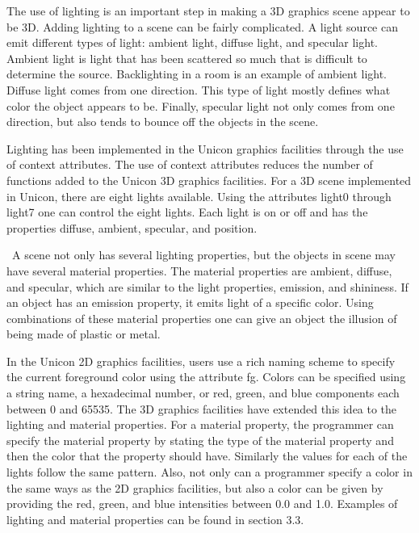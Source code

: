 \documentclass[letterpaper]{article}
\begin{document}
The use of lighting is an important step in making a 3D graphics scene
appear to be 3D. Adding lighting to a scene can be fairly
complicated. A light source can emit different types of light: ambient
light, diffuse light, and specular light. Ambient light is light
that has been scattered so much that is difficult to determine the
source. Backlighting in a room is an example of ambient light. Diffuse
light comes from one direction. This type of light mostly defines what
color the object appears to be. Finally, specular light not only comes
from one direction, but also tends to bounce off the objects in the
scene.

{
Lighting has been implemented in the Unicon graphics facilities through the use of context attributes. The use of
context attributes reduces the number of functions added to the Unicon 3D graphics facilities. For a 3D scene
implemented in Unicon, there are eight lights available. Using the attributes \textsf{light0} through \textsf{light7}
one can control the eight lights. Each light is \textsf{on} or \textsf{off} and has the properties \textsf{diffuse},
\textsf{ambient}, \textsf{specular}, and \textsf{position}. }

{
\ A scene not only has several lighting properties, but the objects in scene may have several material properties. The
material properties are ambient, diffuse, and specular, which are similar to the light properties, emission, and
shininess. If an object has an emission property, it emits light of a specific color. Using combinations of these
material properties one can give an object the illusion of being made of plastic or metal. }

{
In the Unicon 2D graphics facilities, users use a rich naming scheme to specify the current foreground color using the
attribute \textsf{fg}. Colors can be specified using a string name, a hexadecimal number, or red, green, and blue
components each between \textsf{0} and \textsf{65535}. The 3D graphics facilities have extended this idea to the
lighting and material properties. For a material property, the programmer can specify the material property by stating
the type of the material property and then the color that the property should have. Similarly the values for each of
the lights follow the same pattern. Also, not only can a programmer specify a color in the same ways as the 2D
graphics facilities, but also a color can be given by providing the red, green, and blue intensities between
\textsf{0.0} and \textsf{1.0}. Examples of lighting and material properties can be found in section 3.3.}
\end{document}
